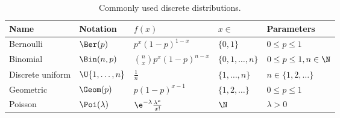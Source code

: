 \begin{table}[H]
	\centering
	\caption{Commonly used discrete distributions.}
	\label{tab:DiscreteDistributions}
	\renewcommand{\arraystretch}{1.5}
	\begin{tabular}{@{}lllll@{}}
		\toprule
		Name             & Notation            & \(f(x)\)                              & \(x \in\)              & Parameters                \\
		\midrule
		Bernoulli        & \(\Ber(p)\)           & \(p^x(1-p)^{1-x}\)                    & \(\{0, 1\}\)           & \(0 \le p \le 1\)           \\
		Binomial         & \(\Bin(n, p)\)        & \(\binom{n}{x}p^x(1-p)^{n-x}\)        & \(\{0, 1, \dots, n\}\) & \(0 \le p \le 1, n \in \N\) \\
		Discrete uniform & \(\U\{1, \dots, n\}\) & \(\frac{1}{n}\)                       & \(\{1, \dots, n\}\)    & \(n \in \{1, 2, \dots\}\)   \\
		Geometric        & \(\Geom(p)\)          & \(p(1-p)^{x-1}\)                      & \(\{1, 2, \dots\}\)    & \(0 \le p \le 1\)           \\
		Poisson          & \(\Poi(\lambda)\)     & \(\e^{-\lambda}\frac{\lambda^x}{x!}\) & \(\N\)                 & \(\lambda > 0\)             \\
		\bottomrule
	\end{tabular}
\end{table}

